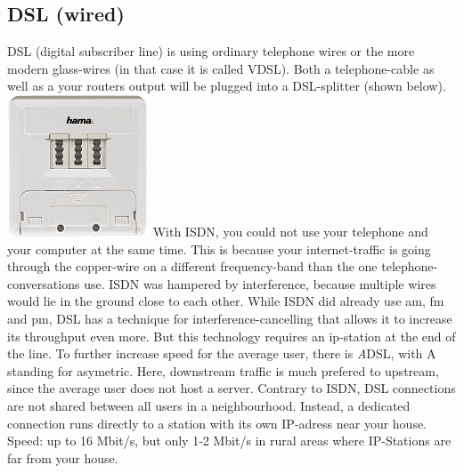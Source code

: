 \subsection{DSL (wired)}
DSL (digital subscriber line) is using ordinary telephone wires or the more modern glass-wires (in that case it is called VDSL). Both a telephone-cable as well as a your routers output will be plugged into a DSL-splitter (shown below).
\includegraphics{images/dsl_splitter.png}
With ISDN, you could not use your telephone and your computer at the same time. This is because your internet-traffic is going through the copper-wire on a different frequency-band than the one telephone-conversations use.  
ISDN was hampered by interference, because multiple wires would lie in the ground close to each other. While ISDN did already use am, fm and pm, DSL has a technique for interference-cancelling that allows it to increase its throughput even more. But this technology requires an ip-station at the end of the line. 
To further increase speed for the average user, there is \emph{A}DSL, with A standing for asymetric. Here, downstream traffic is much prefered to upstream, since the average user does not host a server.
Contrary to ISDN, DSL connections are not shared between all users in a neighbourhood. Instead, a dedicated connection runs directly to a station with its own IP-adress near your house. 
Speed: up to 16 Mbit/s, but only 1-2 Mbit/s in rural areas where IP-Stations are far from your house.



